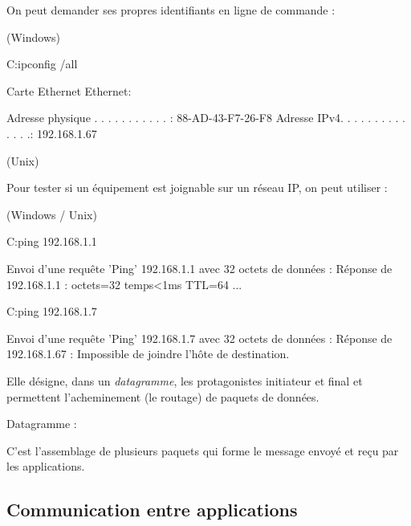 On peut demander ses propres identifiants en ligne de commande :

\smallskip

 (Windows)

\begin{shell}
C:\>ipconfig /all

Carte Ethernet Ethernet:

   Adresse physique . . . . . . . . . . . : 88-AD-43-F7-26-F8
   Adresse IPv4. . . . . . . . . . . . . .: 192.168.1.67
\end{shell}

\smallskip

 (Unix)


\medskip

Pour tester si un équipement est joignable sur un réseau IP, on peut utiliser :

\smallskip

 (Windows / Unix)

\begin{shell}
C:\>ping 192.168.1.1

Envoi d’une requête 'Ping'  192.168.1.1 avec 32 octets de données :
Réponse de 192.168.1.1 : octets=32 temps<1ms TTL=64
...

C:\>ping 192.168.1.7

Envoi d’une requête 'Ping'  192.168.1.7 avec 32 octets de données :
Réponse de 192.168.1.67 : Impossible de joindre l’hôte de destination.
\end{shell}


\medskip

Elle désigne, dans un \emph{datagramme}, les protagonistes initiateur et final et permettent l'acheminement (le routage) de paquets de données. 

Datagramme : 

C'est l'assemblage de plusieurs paquets qui forme le message envoyé et reçu par les applications.
\subsection{Communication entre applications}


